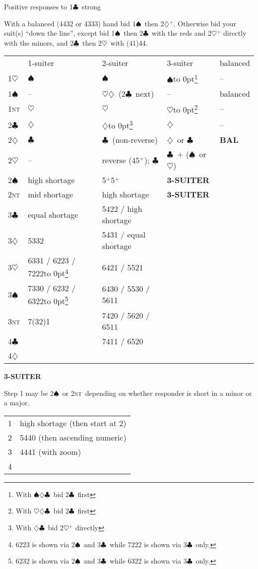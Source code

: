\documentclass{article}
\renewcommand{\c}{$\clubsuit$}
\renewcommand{\d}{$\diamondsuit$}
\newcommand{\h}{$\heartsuit$}
\newcommand{\s}{$\spadesuit$}
\newcommand{\n}{\textsc{nt}}
\newcommand{\+}{$^+$}
\newcommand{\hsmash}[1]{\hbox to 0pt{#1\hss}}
\begin{document}
\begin{table}[htp]
\centering
\begin{minipage}{\textwidth}
Positive responses to 1\c\ strong

With a balanced (4432 or 4333) hand bid 1\s\ then 2\d\+.  Otherwise bid your suit(s) ``down the line'', except bid 1\s\ then 2\c\ with the reds and 2\h\+ directly with the minors, and 2\c\ then 2\h\ with (41)44.

\smallskip

\begin{tabular}{l|l|l|l|l|}
& 1-suiter & 2-suiter & 3-suiter & balanced \\
1\h & \s & \s & \s\hsmash{\footnote{With \s\d\c\ bid 2\c\ first}} & -- \\
1\s & -- & \h\d\ (2\c\ next) & -- & balanced \\
1\n & \h & \h & \h\hsmash{\footnote{With \h\d\c\ bid 2\c\ first}} & -- \\
2\c & \d & \d\hsmash{\footnote{With \d\c\ bid 2\h\+ directly}} & \d & -- \\
2\d & \c & \c\ (non-reverse) & \d\ or \c & \textbf{BAL} \\
2\h & -- & reverse (45\+); \c & \c\ + (\s\ or \h) & \smash{\vdots} \\
2\s & high shortage & 5\+5\+ & \textbf{3-SUITER} \\
2\n & mid shortage & high shortage & \textbf{3-SUITER} \\
3\c & equal shortage & 5422 / high shortage \\
3\d & 5332 & 5431 / equal shortage \\
3\h & 6331 / 6223 / 7222\hsmash{\footnote{6223 is shown via 2\s\ and 3\c\ while 7222 is shown via 3\c\ only.}} & 6421 / 5521 \\
3\s & 7330 / 6232 / 6322\hsmash{\footnote{6232 is shown via 2\s\ and 3\c\ while 6322 is shown via 3\c\ only.}} & 6430 / 5530 / 5611 \\
3\n & 7(32)1 & 7420 / 5620 / 6511 \\
4\c & \smash{\vdots} & 7411 / 6520 \\
4\d & & \smash{\vdots}
\end{tabular}

\bigskip

\textbf{3-SUITER}

Step 1 may be 2\s\ or 2\n\ depending on whether responder is short in a minor or a major.

\smallskip

\begin{tabular}{l|l}
1&high shortage (then start at 2)\\
2&5440 (then ascending numeric)\\
3&4441 (with zoom)\\
4&\smash{\vdots}\\
\end{tabular}


\end{minipage}
\end{table}
\end{document}
